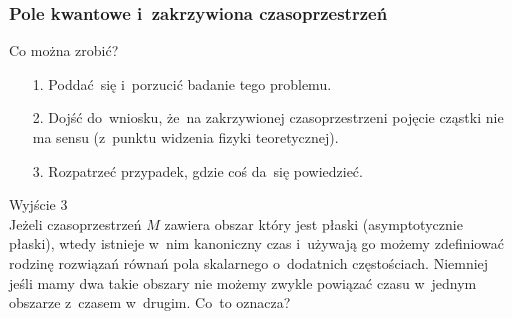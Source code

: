 \documentclass[10pt,t]{beamer}
\begin{document}
\begin{frame}
  \frametitle{Pole kwantowe i~zakrzywiona czasoprzestrzeń}


  Co można zrobić? \\
  \begin{itemize}
    \RaggedRight

  \item[1.] Poddać~się i~porzucić badanie tego problemu.

  \item[2.] Dojść do~wniosku, że~na zakrzywionej czasoprzestrzeni
    pojęcie cząstki nie ma sensu (z~punktu widzenia fizyki
    teoretycznej).

  \item[3.] Rozpatrzeć przypadek, gdzie coś da~się powiedzieć.

  \end{itemize}

  Wyjście 3 \\
  Jeżeli czasoprzestrzeń $M$ zawiera obszar który jest płaski
  (asymptotycznie płaski), wtedy istnieje w~nim kanoniczny czas
  i~używają go możemy zdefiniować rodzinę rozwiązań równań pola
  skalarnego o~dodatnich częstościach. Niemniej jeśli mamy dwa takie
  obszary nie możemy zwykle powiązać czasu w~jednym obszarze
  z~czasem w~drugim. Co~to oznacza?

\end{frame}
\end{document}
